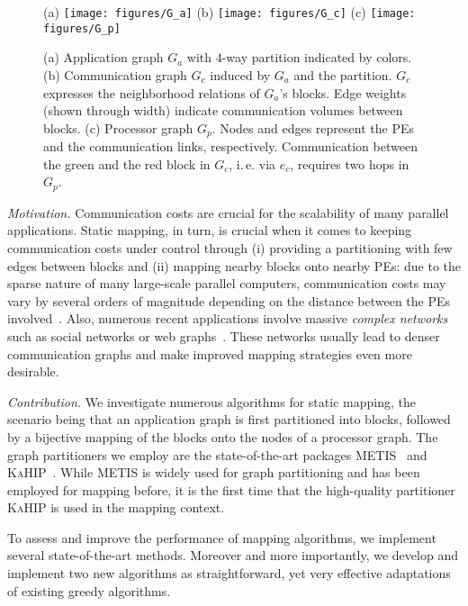\documentclass[pdftex]{llncs}
\newcommand{\ie}{i.\,e.\xspace}
\newcommand{\metis}{\textsc{METIS}\xspace}
\newcommand{\kahip}{\textsc{KaHIP}\xspace}
\begin{document}
\begin{figure}[tb]
\centering{}(a) \texttt{[image: figures/G\_a]} (b)
\texttt{[image: figures/G\_c]} (c)
\texttt{[image: figures/G\_p]}\caption{\label{fig:overview}(a)
  Application graph $G_{a}$ with $4$-way partition indicated by
  colors. (b) Com\-mu\-ni\-ca\-tion graph $G_{c}$ induced by $G_{a}$
  and the partition. $G_c$ expresses the neighborhood relations of
  $G_{a}$'s blocks. Edge weights (shown through width) indicate
  communication volumes between blocks. (c) Processor graph $G_{p}$.
  Nodes and edges represent the PEs and the communication links,
  respectively. Com\-mu\-ni\-ca\-tion between the green and the red
  block in $G_{c}$, \ie via $e_{c}$, requires two hops in $G_{p}$.  }
\vspace{-3ex}
\end{figure}



\noindent \emph{Motivation.} Communication costs are crucial for the
scalability of many parallel applications. Static mapping, in turn, is
crucial when it comes to keeping communication costs under control
through (i) providing a partitioning with few edges between blocks and
(ii) mapping nearby blocks onto nearby PEs: due to the sparse nature
of many large-scale parallel computers,
communication costs may vary by several orders of magnitude depending
on the distance between the PEs
involved~\cite{Teresco2000269}. Also, numerous recent applications involve
massive \emph{complex networks} such as social networks or web graphs~\cite{costa2011analyzing}. These
networks usually lead to denser communication graphs and make improved
mapping strategies even more desirable.

\noindent \emph{Contribution.}
We investigate numerous algorithms for static mapping,
the scenario being that an application graph is first partitioned into
blocks, followed by a bijective mapping of the blocks onto the nodes
of a processor graph. The graph partitioners we employ are the
state-of-the-art packages \metis~\cite{Karypis13a} and
\kahip~\cite{Sanders2013a}. While \metis is widely used for graph
partitioning and has been employed for mapping before, it is the first
time that the high-quality partitioner \kahip is used in the mapping
context.

To assess and improve the performance of mapping algorithms, we
implement several state-of-the-art methods. Moreover and more
importantly, we develop and implement two new algorithms as
straightforward, yet very effective adaptations of existing greedy
algorithms.
\end{document}
